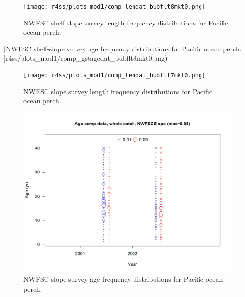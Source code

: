 \documentclass[12pt,]{article}
\begin{document}
\FloatBarrier

\begin{figure}
\centering
\texttt{[image: r4ss/plots\_mod1/comp\_lendat\_bubflt8mkt0.png]}
\caption{NWFSC shelf-slope survey length frequency distributions for
Pacific ocean perch. \label{fig:nw_Length}}
\end{figure}

\FloatBarrier

{[}NWFSC shelf-slope survey age frequency distributions for Pacific
ocean perch.
\label{fig:nw_Age}{]}r4ss/plots\_mod1/comp\_gstagedat\_bubflt8mkt0.png)

\FloatBarrier

\begin{figure}
\centering
\texttt{[image: r4ss/plots\_mod1/comp\_lendat\_bubflt7mkt0.png]}
\caption{NWFSC slope survey length frequency distributions for Pacific
ocean perch. \label{fig:nw_slope_Length}}
\end{figure}

\FloatBarrier

\begin{figure}
\centering
\includegraphics{r4ss/plots_mod1/comp_agedat_bubflt7mkt0.png}
\caption{NWFSC slope survey age frequency distributions for Pacific
ocean perch. \label{fig:nw_slope_Age}}
\end{figure}

\FloatBarrier
\end{document}
